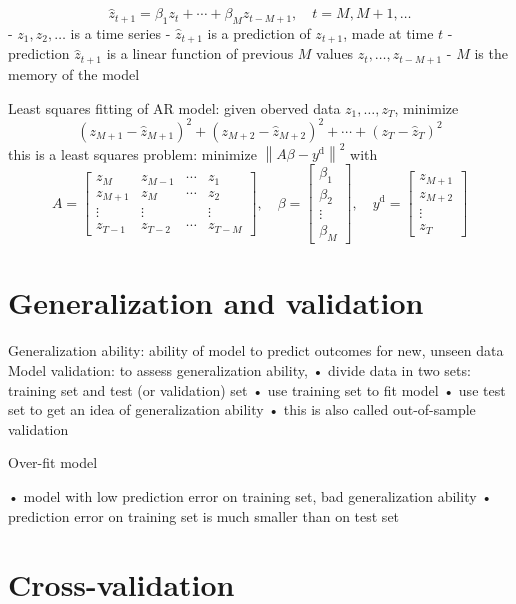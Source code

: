 $$
\hat{z}_{t+1}=\beta_{1} z_{t}+\cdots+\beta_{M} z_{t-M+1}, \quad t=M, M+1, \ldots
$$
- $ z_{1}, z_{2}, \ldots $ is a time series
- $ \hat{z}_{t+1} $ is a prediction of $ z_{t+1} $, made at time $ t $
- prediction $ \hat{z}_{t+1} $ is a linear function of previous $ M $ values $ z_{t}, \ldots, z_{t-M+1} $
- $ M $ is the memory of the model

Least squares fitting of AR model: given oberved data $ z_{1}, \ldots, z_{T} $, minimize
$$
\left(z_{M+1}-\hat{z}_{M+1}\right)^{2}+\left(z_{M+2}-\hat{z}_{M+2}\right)^{2}+\cdots+\left(z_{T}-\hat{z}_{T}\right)^{2}
$$
this is a least squares problem: minimize $ \left\|A \beta-y^{\mathrm{d}}\right\|^{2} $ with
$$
A=\left[\begin{array}{cccc}
z_{M} & z_{M-1} & \cdots & z_{1} \\
z_{M+1} & z_{M} & \cdots & z_{2} \\
\vdots & \vdots & & \vdots \\
z_{T-1} & z_{T-2} & \cdots & z_{T-M}
\end{array}\right], \quad \beta=\left[\begin{array}{c}
\beta_{1} \\
\beta_{2} \\
\vdots \\
\beta_{M}
\end{array}\right], \quad y^{\mathrm{d}}=\left[\begin{array}{c}
z_{M+1} \\
z_{M+2} \\
\vdots \\
z_{T}
\end{array}\right]
$$

\section{Generalization and validation}


Generalization ability: ability of model to predict outcomes for new, unseen data
Model validation: to assess generalization ability,
• divide data in two sets: training set and test (or validation) set
• use training set to fit model
• use test set to get an idea of generalization ability
• this is also called out-of-sample validation

Over-fit model

• model with low prediction error on training set, bad generalization ability
• prediction error on training set is much smaller than on test set

\section{Cross-validation}

